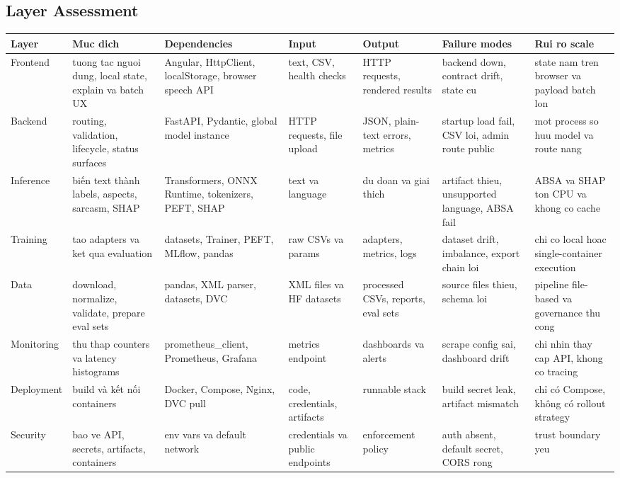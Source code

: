 \subsection{Layer Assessment}
\begin{longtable}{@{}p{}p{}p{}p{}p{}p{}p{}@{}}
\toprule
\textbf{Layer} & \textbf{Muc dich} & \textbf{Dependencies} & \textbf{Input} & \textbf{Output} & \textbf{Failure modes} & \textbf{Rui ro scale} \\
\midrule
\endhead
Frontend & tuong tac nguoi dung, local state, explain va batch UX & Angular, HttpClient, localStorage, browser speech API & text, CSV, health checks & HTTP requests, rendered results & backend down, contract drift, state cu & state nam tren browser va payload batch lon \\
Backend & routing, validation, lifecycle, status surfaces & FastAPI, Pydantic, global model instance & HTTP requests, file upload & JSON, plain-text errors, metrics & startup load fail, CSV loi, admin route public & mot process so huu model va route nang \\
Inference & biến text thành labels, aspects, sarcasm, SHAP & Transformers, ONNX Runtime, tokenizers, PEFT, SHAP & text va language & du doan va giai thich & artifact thieu, unsupported language, ABSA fail & ABSA va SHAP ton CPU va khong co cache \\
Training & tao adapters va ket qua evaluation & datasets, Trainer, PEFT, MLflow, pandas & raw CSVs va params & adapters, metrics, logs & dataset drift, imbalance, export chain loi & chi co local hoac single-container execution \\
Data & download, normalize, validate, prepare eval sets & pandas, XML parser, datasets, DVC & XML files va HF datasets & processed CSVs, reports, eval sets & source files thieu, schema loi & pipeline file-based va governance thu cong \\
Monitoring & thu thap counters va latency histograms & prometheus\_client, Prometheus, Grafana & metrics endpoint & dashboards va alerts & scrape config sai, dashboard drift & chi nhin thay cap API, khong co tracing \\
Deployment & build và kết nối containers & Docker, Compose, Nginx, DVC pull & code, credentials, artifacts & runnable stack & build secret leak, artifact mismatch & chỉ có Compose, không có rollout strategy \\
Security & bao ve API, secrets, artifacts, containers & env vars va default network & credentials va public endpoints & enforcement policy & auth absent, default secret, CORS rong & trust boundary yeu \\
\bottomrule
\end{longtable}


